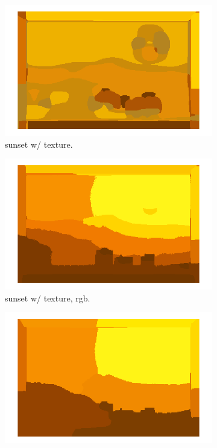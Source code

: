 \documentclass[12pt]{report}
\begin{document}
\begin{enumerate}
  \begin{figure}[H]
    \centering
    \begin{subfigure}{0.3\linewidth}
      \includegraphics[width=\linewidth]{p1img1c.png}
      \caption{sunset w/ texture.}
    \end{subfigure}
    \begin{subfigure}{0.3\linewidth}
      \includegraphics[width=\linewidth]{p2img1c.png}
      \caption{sunset w/ texture, rgb.}
    \end{subfigure}
    \begin{subfigure}{0.3\linewidth}
      \includegraphics[width=\linewidth]{p3img1c.png}

\end{subfigure}
\end{figure}
\end{enumerate}
\end{document}
